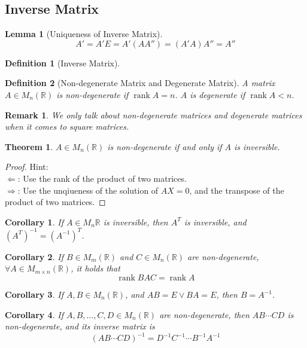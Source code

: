 \documentclass[onecolumn]{ctexart}
\newtheorem{definition}{Definition}
\newtheorem{theorem}{Theorem}
\newtheorem{lemma}{Lemma}
\newtheorem{corollary}{Corollary}
\newtheorem{remark}{Remark}
\DeclareMathOperator{\rank}{rank}
\begin{document}
\subsection{Inverse Matrix}
\begin{lemma}[Uniqueness of Inverse Matrix]
  \[
    A' = A'E = A'(AA'') = (A'A)A'' = A''
  \]
\end{lemma}
\begin{definition}[Inverse Matrix]
  
\end{definition}

\begin{definition}[Non-degenerate Matrix and Degenerate Matrix]
  A matrix $A \in M_n(\mathbb{R})$ is non-degenerate if $\rank A = n$. $A$ is 
  degenerate if $\rank A < n$.
\end{definition}
\begin{remark}
  We only talk about non-degenerate matrices and degenerate matrices when it 
  comes to square matrices.
\end{remark}

\begin{theorem}
  $A \in M_n(\mathbb{R})$ is non-degenerate if and only if $A$ is inversible.
\end{theorem}
\begin{proof}
  Hint: \\
  $\Leftarrow$: Use the rank of the product of two matrices. \\
  $\Rightarrow$: Use the unqiueness of the solution of $AX = 0$, and the 
  transpose of the product of two matrices.
\end{proof}

\begin{corollary}
  If $A \in M_n{\mathbb{R}}$ is inversible, then $A^T$ is inversible, and 
  $(A^T)^{-1} = (A^{-1})^T$.
\end{corollary}

\begin{corollary}
  If $B \in M_m(\mathbb{R})$ and $C \in M_n(\mathbb{R})$ are non-degenerate, 
  $\forall A \in M_{m \times n}(\mathbb{R})$, it holds that
  \[
    \rank BAC = \rank A
  \]
\end{corollary}

\begin{corollary}
  If $A, B \in M_n(\mathbb{R})$, and $AB = E \vee BA = E$, then $B = A^{-1}$.
\end{corollary}

\begin{corollary}
  If $A, B, \ldots, C, D \in M_n(\mathbb{R})$ are non-degenerate, then 
  $AB \cdots CD$ is non-degenerate, and its inverse matrix is
  \[
    (AB \cdots CD)^{-1} = D^{-1} C^{-1} \cdots B^{-1} A^{-1}
  \]
\end{corollary}
\end{document}
